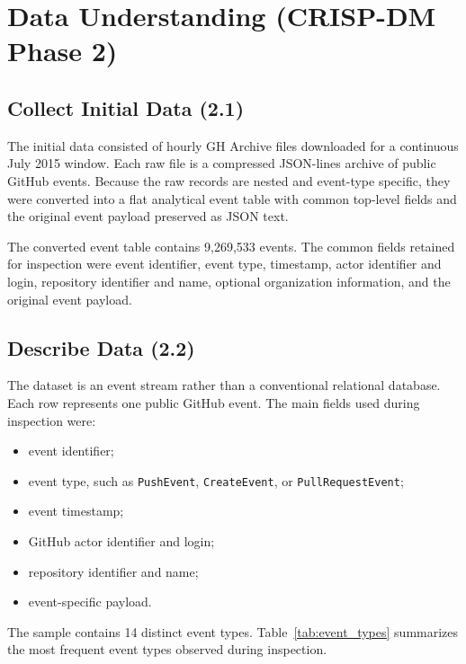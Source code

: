 \clearpage
\section{Data Understanding (CRISP-DM Phase 2)}

\subsection{Collect Initial Data (2.1)}

The initial data consisted of hourly GH Archive files downloaded for a continuous July 2015 window. Each raw
file is a compressed JSON-lines archive of public GitHub events. Because the raw records are nested and
event-type specific, they were converted into a flat analytical event table with common top-level fields and
the original event payload preserved as JSON text.

The converted event table contains 9,269,533 events. The common fields retained for inspection were event
identifier, event type, timestamp, actor identifier and login, repository identifier and name, optional
organization information, and the original event payload.

\subsection{Describe Data (2.2)}

The dataset is an event stream rather than a conventional relational database. Each row represents one public
GitHub event. The main fields used during inspection were:

\begin{itemize}
    \item event identifier;
    \item event type, such as \texttt{PushEvent}, \texttt{CreateEvent}, or \texttt{PullRequestEvent};
    \item event timestamp;
    \item GitHub actor identifier and login;
    \item repository identifier and name;
    \item event-specific payload.
\end{itemize}

The sample contains 14 distinct event types. Table~\ref{tab:event_types} summarizes the most frequent event
types observed during inspection.

